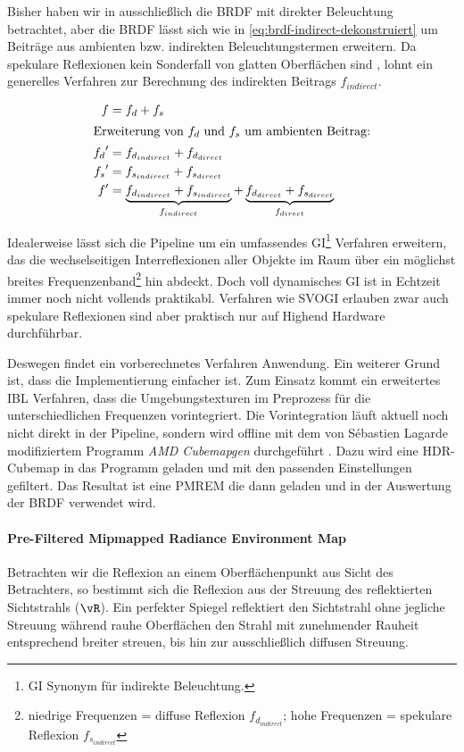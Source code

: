 Bisher haben wir in  ausschließlich die \ac{BRDF} mit direkter Beleuchtung betrachtet, aber die \ac{BRDF} lässt sich wie in \ref{eq:brdf-indirect-dekonstruiert} um Beiträge aus ambienten bzw. indirekten Beleuchtungstermen erweitern. Da spekulare Reflexionen kein Sonderfall von glatten Oberflächen sind \parencite{Hable2010}, lohnt ein generelles Verfahren zur Berechnung des indirekten Beitrags $f_{indirect}$. 

\begin{align}
	\label{eq:brdf-indirect}
	f   &= f_d + f_s\\
	\intertext{Erweiterung von $f_d$ und $f_s$ um ambienten Beitrag:}
	{f_d}^{\prime} &= f_{d_{indirect}} + f_{d_{direct}}\\
	{f_s}^{\prime} &= f_{s_{indirect}} + f_{s_{direct}}\\
	\label{eq:brdf-indirect-dekonstruiert}
	f^{\prime}   &= \underbrace{f_{d_{indirect}} + f_{s_{indirect}}}_{f_{indirect}} + \underbrace{f_{d_{direct}} + f_{s_{direct}}}_{f_{direct}}
\end{align}

Idealerweise lässt sich die Pipeline um ein umfassendes \acf{GI}\footnote{\acl{GI} Synonym für indirekte Beleuchtung.} Verfahren erweitern, das die wechselseitigen Interreflexionen aller Objekte im Raum über ein möglichst breites Frequenzenband\footnote{niedrige Frequenzen = diffuse Reflexion $f_{d_{indirect}}$; hohe Frequenzen = spekulare Reflexion $f_{s_{indirect}}$} hin abdeckt. Doch voll dynamisches \ac{GI} ist in Echtzeit immer noch nicht vollends praktikabl. Verfahren wie \ac{SVOGI} \parencite{Lin2013} erlauben zwar auch spekulare Reflexionen sind aber praktisch nur auf Highend Hardware durchführbar.

Deswegen findet ein vorberechnetes Verfahren Anwendung. Ein weiterer Grund ist, dass die Implementierung einfacher ist. Zum Einsatz kommt ein erweitertes \acf{IBL} Verfahren, dass die Umgebungstexturen im Preprozess für die unterschiedlichen Frequenzen vorintegriert. Die Vorintegration läuft aktuell noch nicht direkt in der Pipeline, sondern wird offline mit dem von Sébastien Lagarde modifiziertem Programm \textit{AMD Cubemapgen} durchgeführt \parencite{Lagarde2012a}. Dazu wird eine HDR-Cubemap in das Programm geladen und mit den passenden Einstellungen gefiltert. Das Resultat ist eine \ac{PMREM} die dann geladen und in der Auswertung der \ac{BRDF} verwendet wird.

\paragraph{Pre-Filtered Mipmapped Radiance Environment Map} Betrachten wir die Reflexion an einem Oberflächenpunkt aus Sicht des Betrachters, so bestimmt sich die Reflexion aus der Streuung des reflektierten Sichtstrahls ($\vR$). Ein perfekter Spiegel reflektiert den Sichtstrahl ohne jegliche Streuung während rauhe Oberflächen den Strahl mit zunehmender Rauheit entsprechend breiter streuen, bis hin zur ausschließlich diffusen Streuung.


